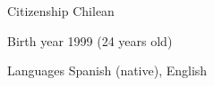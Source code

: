 
\begin{cvskills}

	\cvskill
	{Citizenship}
    {Chilean}

	\cvskill
	{Birth year}
    {1999 (24 years old)}

	\cvskill
	{Languages}
    {Spanish (native), English}

\end{cvskills}
